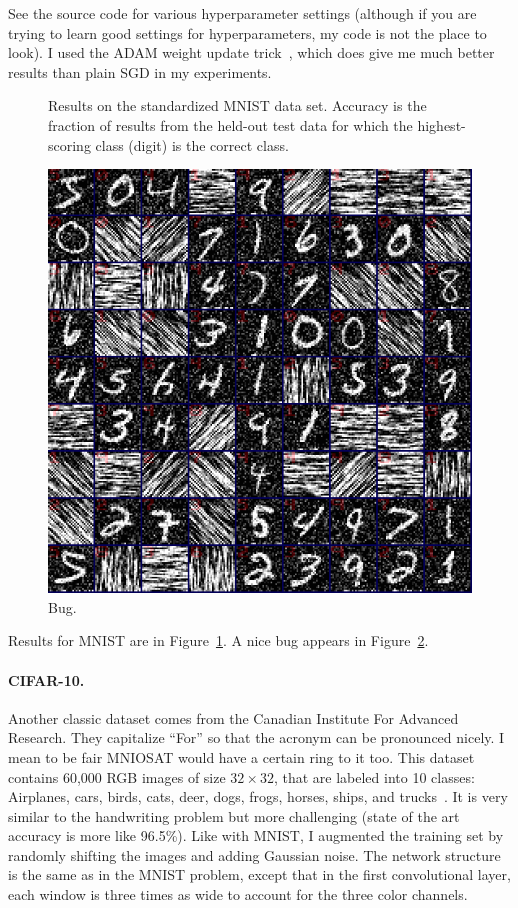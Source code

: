 \documentclass[twocolumn]{article}
\begin{document}
See the source code for various hyperparameter settings (although if
you are trying to learn good settings for hyperparameters, my code is
not the place to look). I used the ADAM weight update
trick~\cite{kingma2014adam}, which does give me much better results
than plain SGD in my experiments.

\begin{figure}[htp]
  
  \caption{
    Results on the standardized MNIST data set. Accuracy is the
    fraction of results from the held-out test data for which the
    highest-scoring class (digit) is the correct class.
  } \label{fig:mnistresults}
\end{figure}

\begin{figure}[htp]
  \includegraphics[width=0.9 \linewidth]{mnist-bug}
  \caption{
    Bug.
  } \label{fig:mnistbug}
\end{figure}

Results for MNIST are in Figure~\ref{fig:mnistresults}.
A nice bug appears in Figure~\ref{fig:mnistbug}.

\paragraph{CIFAR-10.}
Another classic dataset comes from the Canadian Institute For Advanced
Research. They capitalize ``For'' so that the acronym can be
pronounced nicely. I mean to be fair MNIOSAT would have a certain ring
to it too. This dataset contains 60,000 RGB images of size $32 \times 32$, that
are labeled into 10 classes: Airplanes, cars, birds, cats, deer, dogs,
frogs, horses, ships, and trucks~\cite{krizhevsky2009learning}. It is
very similar to the handwriting problem but more challenging (state of
the art accuracy is more like 96.5\%). Like with MNIST, I augmented the
training set by randomly shifting the images and adding Gaussian
noise. The network structure is the same as in the MNIST problem,
except that in the first convolutional layer, each window is three
times as wide to account for the three color channels.
\end{document}
